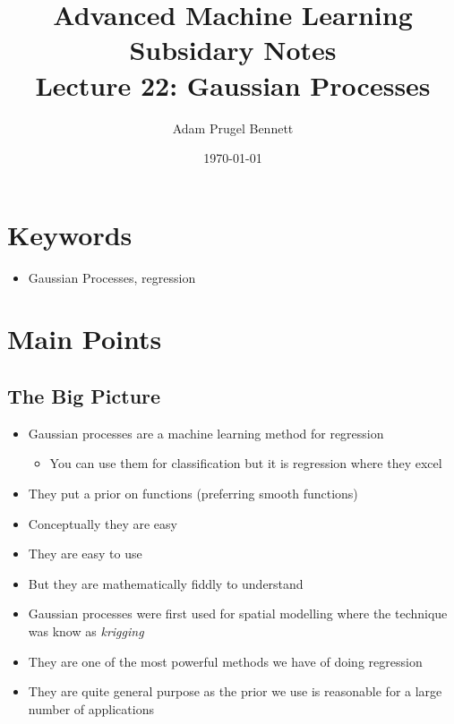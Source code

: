 \documentclass[11pt]{article}
\author{Adam Prugel Bennett}
\date{\today}
\title{Advanced Machine Learning Subsidary Notes\\\medskip
\large Lecture 22: Gaussian Processes}
\begin{document}
\maketitle
\section{Keywords}
\label{sec:org3d322d3}
\begin{itemize}
\item Gaussian Processes, regression
\end{itemize}
\section{Main Points}
\label{sec:org27ec4ff}

\subsection{The Big Picture}
\label{sec:orge8c8754}
\begin{itemize}
\item Gaussian processes are a machine learning method for regression
\begin{itemize}
\item You can use them for classification but it is regression where they excel
\end{itemize}
\item They put a prior on functions (preferring smooth functions)
\item Conceptually they are easy
\item They are easy to use
\item But they are mathematically fiddly to understand
\item Gaussian processes were first used for spatial modelling where
the technique was know as \emph{krigging}
\item They are one of the most powerful methods we have of doing regression
\item They are quite general purpose as the prior we use is reasonable
for a large number of applications
\end{itemize}
\end{document}
